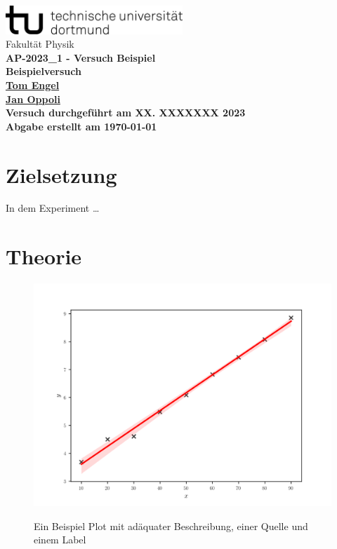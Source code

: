 \documentclass[12pt]{article}
\begin{document}
\begin{titlepage}
  \centering
  \vspace*{1cm}
  \includegraphics[width=0.5\textwidth]{Ressourcen/tud_logo_schwarz(RGB)}\\
  \vspace*{0.25cm}
  \large\textmd{Fakultät Physik} \\
  \vspace*{6cm}
  \huge \bfseries AP-2023\_1 - Versuch Beispiel \\
  \vspace*{0.25cm}
  \large Beispielversuch \\
  \vspace*{0.25cm}
  \large\textmd{\href{mailto:tom.engel@tu-dortmund.de}{Tom Engel}} \\
  \large\textmd{\href{mailto:tom.engel@tu-dortmund.de}{Jan Oppoli}} \\
  \vfill
  \small\textmd{Versuch durchgeführt am XX. XXXXXXX 2023}\\
  \small\textmd{Abgabe erstellt am \today}
\end{titlepage}
\tableofcontents
\newpage

\section{Zielsetzung}\label{sec:zielsetzung}
In dem Experiment \ldots

\section{Theorie}\label{sec:theorie}

\begin{figure}[H]
  \centering
  \includegraphics[scale=0.5]{Ressourcen/VBeispiel_plot.svg}
  \caption{Ein Beispiel Plot mit adäquater Beschreibung, einer Quelle und einem Label}\cite{anleitung}\label{fig:1}
\end{figure}
\end{document}
